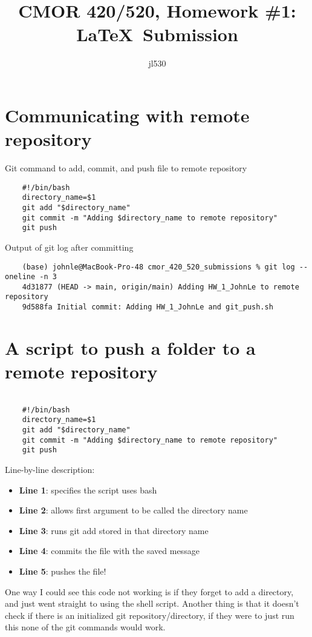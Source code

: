 \documentclass[10pt,letterpaper]{article}
\author{jl530}
\title{CMOR 420/520, Homework \#1: \LaTeX \ Submission}
\theoremstyle{definition}
\theoremstyle{definition}
\begin{document}
\maketitle

\section{Communicating with remote repository}
Git command to add, commit, and push file to remote repository
\begin{verbatim}
    #!/bin/bash 
    directory_name=$1 
    git add "$directory_name" 
    git commit -m "Adding $directory_name to remote repository" 
    git push
\end{verbatim}
Output of git log after committing
\begin{verbatim}
    (base) johnle@MacBook-Pro-48 cmor_420_520_submissions % git log --oneline -n 3 
    4d31877 (HEAD -> main, origin/main) Adding HW_1_JohnLe to remote repository 
    9d588fa Initial commit: Adding HW_1_JohnLe and git_push.sh
\end{verbatim}

\section{A script to push a folder to a remote repository}

\begin{lstlisting}[caption={Bash script for pushing a folder to a remote Git repository.}]

    #!/bin/bash 
    directory_name=$1 
    git add "$directory_name" 
    git commit -m "Adding $directory_name to remote repository" 
    git push
\end{lstlisting}

Line-by-line description:
\begin{itemize}
    \item \textbf{Line 1}: specifies the script uses bash
    \item \textbf{Line 2}: allows first argument to be called the directory name
    \item \textbf{Line 3}: runs git add stored in that directory name
    \item \textbf{Line 4}: commits the file with the saved message
    \item \textbf{Line 5}: pushes the file!
\end{itemize}

One way I could see this code not working is if they forget to add a directory, and just went straight to using the shell script. Another thing is that it doesn't check if there is an initialized git repository/directory, if they were to just run this none of the git commands would work. 
\end{document}
